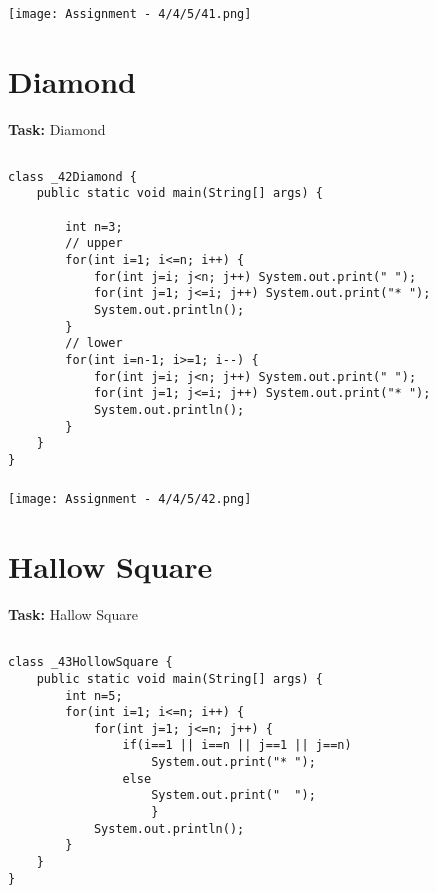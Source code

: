 \documentclass[12pt,a4paper]{article}
\begin{document}
\subsubsection{}
\begin{center}
    \texttt{[image: Assignment - 4/4/5/41.png]}
\end{center}


\section{Diamond}
\textbf{Task:} Diamond

\subsection{}
\begin{lstlisting}
class _42Diamond {
    public static void main(String[] args) {
    
        int n=3;
        // upper
        for(int i=1; i<=n; i++) {
            for(int j=i; j<n; j++) System.out.print(" ");
            for(int j=1; j<=i; j++) System.out.print("* ");
            System.out.println();
        }
        // lower
        for(int i=n-1; i>=1; i--) {
            for(int j=i; j<n; j++) System.out.print(" ");
            for(int j=1; j<=i; j++) System.out.print("* ");
            System.out.println();
        }
    }
}
\end{lstlisting}

\subsubsection{}
\begin{center}
    \texttt{[image: Assignment - 4/4/5/42.png]}
\end{center}


\section{Hallow Square}
\textbf{Task:} Hallow Square

\subsection{}
\begin{lstlisting}
class _43HollowSquare {
    public static void main(String[] args) {
        int n=5;
        for(int i=1; i<=n; i++) {
            for(int j=1; j<=n; j++) {
                if(i==1 || i==n || j==1 || j==n)
                    System.out.print("* ");
                else
                    System.out.print("  ");
                    }
            System.out.println();
        }
    }
}

\end{lstlisting}
\end{document}
